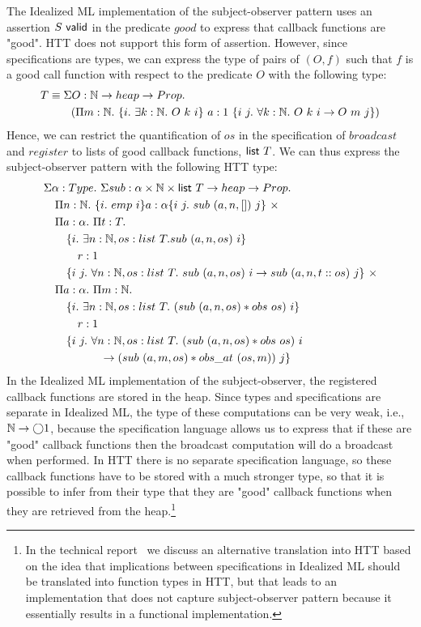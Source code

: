 The Idealized ML implementation of the subject-observer pattern uses an
assertion $S\mbox{\textsf{{ valid}}}$ in the predicate $good$ to express that callback functions
are "good". HTT does not support this form of assertion. However, since
specifications are types, we can express the type of pairs of $(O, f)$ such
that $f$ is a good call function with respect to the predicate $O$ with the
following type: 
{\small\begin{align*}
T &\equiv \Sigma O : \N \rightarrow \HEAP \rightarrow \PROP.\\
&\quad\quad (\Pi m : \N.\ \{ i.\ \exists k : \N.\ O\ k\ i\}\ a : 1\ \{ i\ j.\ \forall k : \N.\ O\ k\ i \rightarrow O\ m\ j \})
\end{align*}}
Hence, we can restrict the quantification of $os$ in the specification of
$broadcast$ and $register$ to lists of good callback functions, $\mbox{\textsf{{list }}}{T}$.
We can thus express the subject-observer pattern with the following HTT type:
{\small
\begin{align*}
&\Sigma \alpha : \TYPE.\ \Sigma sub : \alpha \times \N \times \listtype T
\rightarrow \HEAP \rightarrow \PROP.\\
&\quad \Pi n : \N.\ \{ i.\ emp\ i \} a : \alpha \{ i\ j.\ sub\ (a, n, [])\ j \}\ \times\\
&\quad \Pi a : \alpha.\ \Pi t : T.\\
&\quad\quad\{ i.\ \exists n : \N, os : list\ T. sub\ (a, n, os)\ i \}\\
&\quad\quad\quad r : 1\\
&\quad\quad \{ i\ j.\ \forall n : \N, os : list\ T.\ sub\ (a, n, os)\ i \rightarrow sub\ (a, n, t::os)\ j
\}\ \times\\
&\quad \Pi a : \alpha.\ \Pi m : \N.\\
&\quad\quad\{ i.\ \exists n : \N, os : list\ T.\ (sub\ (a, n, os) * obs\ os)\ i \}\\
&\quad\quad\quad r : 1\\
&\quad\quad \{ i\ j.\ \forall n : \N, os : list\ T.\ (sub\ (a, n, os) * obs\ os)\ i\\
&\quad\quad\quad\quad\quad \rightarrow (sub\ (a, m, os) * obs\_at\ (os, m))\ j \}
\end{align*}} In the Idealized ML implementation of the subject-observer,
the registered callback functions are stored in the heap. Since types and
specifications are separate in Idealized ML, the type of these computations
can be very weak, i.e., $\mathbb{N} \rightarrow \bigcirc{1}$, because the
specification language allows us to express that if these are "good"
callback functions then the broadcast computation will do a broadcast when
performed. In HTT there is no separate specification language, so these
callback functions have to be stored with a much stronger type, so that it
is possible to infer from their type that they are "good" callback
functions when they are retrieved from the heap.\footnote{In the technical
  report~\cite{svendsen08} we discuss an alternative translation into HTT
  based on the idea that implications between specifications in Idealized
  ML should be translated into function types in HTT, but that leads to
  an implementation that does not capture subject-observer pattern because
  it essentially results in a functional implementation.}

